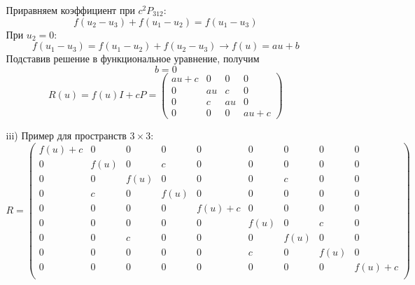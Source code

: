 \documentclass[12pt]{article}
\theoremstyle{definition}
\begin{document}
\begin{enumerate}
\begin{itemize}
\begin{equation}
        \end{equation}
        Приравняем коэффициент при $c^2P_{312}$:
        \begin{equation}
            f(u_2-u_3)+f(u_1-u_2)=f(u_1-u_3)
        \end{equation}
        При $u_2=0$:
        \begin{equation}
            f(u_1-u_3)=f(u_1-u_2)+f(u_2-u_3)\rightarrow f(u)=au+b
        \end{equation}
        Подставив решение в функциональное уравнение, получим
        \begin{equation}
            b=0
        \end{equation}
        \begin{equation}
            \boxed{R(u)=f(u)I+cP=\begin{pmatrix}
                au+c & 0 & 0 & 0\\
                0 & au & c & 0\\
                0 & c & au & 0\\
                0 & 0 & 0 & au+c
            \end{pmatrix}}
        \end{equation}
        \item[iii)] Пример для пространств $3\times3$:
        \begin{equation}
            \boxed{R=\begin{pmatrix}
                f(u)+c & 0 & 0 & 0 & 0 & 0 & 0 & 0 & 0\\
                0 & f(u) & 0 & c & 0 & 0 & 0 & 0 & 0\\
                0 & 0 & f(u) & 0 & 0 & 0 & c & 0 & 0\\
                0 & c & 0 & f(u) & 0 & 0 & 0 & 0 & 0\\
                0 & 0 & 0 & 0 & f(u)+c & 0 & 0 & 0 & 0\\
                0 & 0 & 0 & 0 & 0 & f(u) & 0 & c & 0\\
                0 & 0 & c & 0 & 0 & 0 & f(u) & 0 & 0\\
                0 & 0 & 0 & 0 & 0 & c & 0 & f(u) & 0\\
                0 & 0 & 0 & 0 & 0 & 0 & 0 & 0 & f(u)+c\\
            \end{pmatrix}}
        \end{equation}
    \end{itemize}
\end{enumerate}
\end{document}

